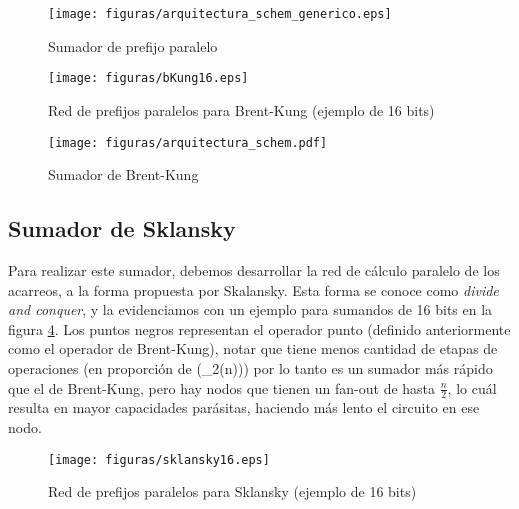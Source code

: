 \begin{figure}[h]
  \centering
\texttt{[image: figuras/arquitectura\_schem\_generico.eps]}
  \caption{Sumador de prefijo paralelo}
  \label{fig:ppadder}
\end{figure}

\begin{figure}[h!]
\vspace{-5pt}
  \centering
\texttt{[image: figuras/bKung16.eps]}
  \caption{Red de prefijos paralelos para Brent-Kung (ejemplo de 16 bits)}
\label{bKung16}
\vspace{-10pt}
\end{figure}

\begin{figure}[h]
  \centering
\texttt{[image: figuras/arquitectura\_schem.pdf]}
  \caption{Sumador de Brent-Kung}
  \label{fig:bkungadder}
\end{figure}

\subsection{Sumador de Sklansky}\label{subsec:sklansky}
Para realizar este sumador, debemos desarrollar la red de cálculo paralelo de los acarreos, a la forma propuesta por Skalansky. Esta forma se conoce como \emph{divide and conquer}, y la evidenciamos con un ejemplo para sumandos de 16 bits en la figura \ref{fig:sklansky16}. Los puntos negros representan el operador punto (definido anteriormente como el operador de Brent-Kung), notar que tiene menos cantidad de etapas de operaciones (en proporción de (\log_2(n))\)) por lo tanto es un sumador más rápido que el de Brent-Kung, pero hay nodos que tienen un fan-out de hasta $\frac{n}{2}$, lo cuál resulta en mayor capacidades parásitas, haciendo más lento el circuito en ese nodo.

\begin{figure}[h!]
\vspace{-5pt}
  \centering
\texttt{[image: figuras/sklansky16.eps]}
  \caption{Red de prefijos paralelos para Sklansky (ejemplo de 16 bits)}
\label{fig:sklansky16}
\vspace{-10pt}
\end{figure}
